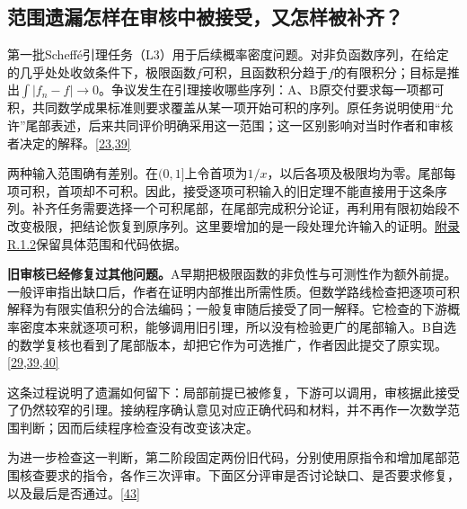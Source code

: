 \subsection[范围遗漏怎样在审核中被接受，又怎样被补齐？]{\texorpdfstring{\protect\hypertarget{section-4-1}{}范围遗漏怎样在审核中被接受，又怎样被补齐？}{范围遗漏怎样在审核中被接受，又怎样被补齐？}}
第一批Scheffé引理任务（L3）用于后续概率密度问题。对非负函数序列，在给定的几乎处处收敛条件下，极限函数$f$可积，且函数积分趋于$f$的有限积分；目标是推出$\int|f_n-f|\to0$。争议发生在引理接收哪些序列：A、B原交付要求每一项都可积，共同数学成果标准则要求覆盖从某一项开始可积的序列。原任务说明使用“允许”尾部表述，后来共同评价明确采用这一范围；这一区别影响对当时作者和审核者决定的解释。\hyperlink{ref-23}{\mbox{[23,39]}}

两种输入范围确有差别。在$(0,1]$上令首项为$1/x$，以后各项及极限均为零。尾部每项可积，首项却不可积。因此，接受逐项可积输入的旧定理不能直接用于这条序列。补齐任务需要选择一个可积尾部，在尾部完成积分论证，再利用有限初始段不改变极限，把结论恢复到原序列。这里要增加的是一段处理允许输入的证明。\href{zh-appendix.pdf\#r1-2}{附录R.1.2}保留具体范围和代码依据。

\textbf{旧审核已经修复过其他问题。}A早期把极限函数的非负性与可测性作为额外前提。一般评审指出缺口后，作者在证明内部推出所需性质。但数学路线检查把逐项可积解释为有限实值积分的合法编码；一般复审随后接受了同一解释。它检查的下游概率密度本来就逐项可积，能够调用旧引理，所以没有检验更广的尾部输入。B自选的数学复核也看到了尾部版本，却把它作为可选推广，作者因此提交了原实现。\hyperlink{ref-29}{\mbox{[29,39,40]}}

这条过程说明了遗漏如何留下：局部前提已被修复，下游可以调用，审核据此接受了仍然较窄的引理。接纳程序确认意见对应正确代码和材料，并不再作一次数学范围判断；因而后续程序检查没有改变该决定。

为进一步检查这一判断，第二阶段固定两份旧代码，分别使用原指令和增加尾部范围核查要求的指令，各作三次评审。下面区分评审是否讨论缺口、是否要求修复，以及最后是否通过。\hyperlink{ref-43}{\mbox{[43]}}

